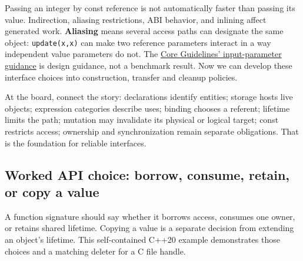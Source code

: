 Passing an integer by const reference is not automatically faster than passing its value. Indirection, aliasing restrictions, ABI behavior, and inlining affect generated work. \textbf{Aliasing} means several access paths can designate the same object: \texttt{update(x,x)} can make two reference parameters interact in a way independent value parameters do not. The \href{https://isocpp.github.io/CppCoreGuidelines/CppCoreGuidelines\#f16-for-in-parameters-pass-cheaply-copied-types-by-value-and-others-by-reference-to-const}{Core Guidelines' input-parameter guidance} is design guidance, not a benchmark result. Now we can develop these interface choices into construction, transfer and cleanup policies.

At the board, connect the story: declarations identify entities; storage hosts live objects; expression categories describe uses; binding chooses a referent; lifetime limits the path; mutation may invalidate its physical or logical target; const restricts access; ownership and synchronization remain separate obligations. That is the foundation for reliable interfaces.

\subsection{Worked API choice: borrow, consume, retain, or copy a value}\label{01-foundations-i-ch003-worked-api-choice-borrow-consume-retain-or-copy-a-value}

A function signature should say whether it borrows access, consumes one owner, or retains shared lifetime. Copying a value is a separate decision from extending an object's lifetime. This self-contained C++20 example demonstrates those choices and a matching deleter for a C file handle.

